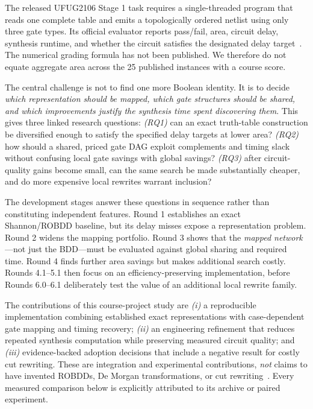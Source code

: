 \documentclass[journal,10pt]{IEEEtran}
\begin{document}
The released UFUG2106 Stage 1 task requires a single-threaded program that reads one complete table and emits a topologically ordered netlist using only three gate types. Its official evaluator reports pass/fail, area, circuit delay, synthesis runtime, and whether the circuit satisfies the designated delay target~\cite{coursehandout}. The numerical grading formula has not been published. We therefore do not equate aggregate area across the 25 published instances with a course score.

The central challenge is not to find one more Boolean identity. It is to decide \emph{which representation should be mapped, which gate structures should be shared, and which improvements justify the synthesis time spent discovering them}. This gives three linked research questions: \emph{(RQ1)} can an exact truth-table construction be diversified enough to satisfy the specified delay targets at lower area? \emph{(RQ2)} how should a shared, priced gate DAG exploit complements and timing slack without confusing local gate savings with global savings? \emph{(RQ3)} after circuit-quality gains become small, can the same search be made substantially cheaper, and do more expensive local rewrites warrant inclusion?

The development stages answer these questions in sequence rather than constituting independent features. Round 1 establishes an exact Shannon/ROBDD baseline, but its delay misses expose a representation problem. Round 2 widens the mapping portfolio. Round 3 shows that the \emph{mapped network}---not just the BDD---must be evaluated against global sharing and required time. Round 4 finds further area savings but makes additional search costly. Rounds 4.1--5.1 then focus on an efficiency-preserving implementation, before Rounds 6.0--6.1 deliberately test the value of an additional local rewrite family.

The contributions of this course-project study are \emph{(i)} a reproducible implementation combining established exact representations with case-dependent gate mapping and timing recovery; \emph{(ii)} an engineering refinement that reduces repeated synthesis computation while preserving measured circuit quality; and \emph{(iii)} evidence-backed adoption decisions that include a negative result for costly cut rewriting. These are integration and experimental contributions, \emph{not} claims to have invented ROBDDs, De Morgan transformations, or cut rewriting~\cite{bryant1986,mishchenko2006}. Every measured comparison below is explicitly attributed to its archive or paired experiment.
\end{document}
